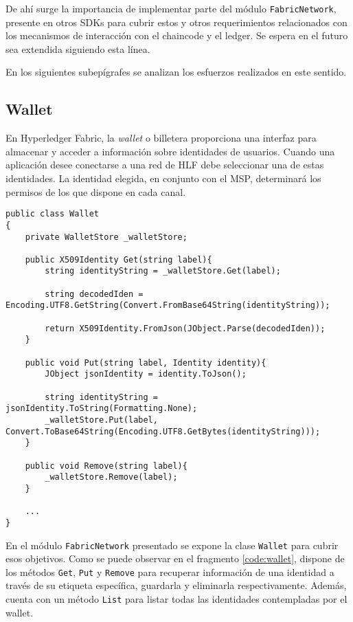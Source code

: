 De ah\'i surge la importancia de implementar parte del m\'odulo \texttt{FabricNetwork}, presente en otros SDKs para cubrir estos y otros requerimientos relacionados con los mecanismos de interacci\'on con el chaincode y el ledger. Se espera en el futuro sea extendida siguiendo esta l\'inea.

En los siguientes subep\'igrafes se analizan los esfuerzos realizados en este sentido.%

\subsection{Wallet}

En Hyperledger Fabric, la \emph{wallet} o billetera proporciona una interfaz para almacenar y acceder a información sobre identidades de usuarios. Cuando una aplicaci\'on desee conectarse a una red de HLF debe seleccionar una de estas identidades. La identidad elegida, en conjunto con el MSP, determinar\'a los permisos de los que dispone en cada canal. %

\begin{lstlisting}[caption={Elementos de la clase \texttt{Wallet}.}, label={code:wallet}]
public class Wallet
{
	private WalletStore _walletStore;

	public X509Identity Get(string label){
		string identityString = _walletStore.Get(label);
		
		string decodedIden = Encoding.UTF8.GetString(Convert.FromBase64String(identityString));
		
		return X509Identity.FromJson(JObject.Parse(decodedIden));
	}

	public void Put(string label, Identity identity){
		JObject jsonIdentity = identity.ToJson();
		
		string identityString = jsonIdentity.ToString(Formatting.None);
		_walletStore.Put(label, Convert.ToBase64String(Encoding.UTF8.GetBytes(identityString)));
	}

	public void Remove(string label){
		_walletStore.Remove(label);
	}
	
	...
}
\end{lstlisting}

En el m\'odulo \texttt{FabricNetwork} presentado se expone la clase \texttt{Wallet} para cubrir esos objetivos. Como se puede observar en el fragmento \ref{code:wallet}, dispone de los m\'etodos \texttt{Get}, \texttt{Put} y \texttt{Remove} para recuperar informaci\'on de una identidad a trav\'es de su etiqueta espec\'ifica, guardarla y eliminarla respectivamente. Adem\'as, cuenta con un m\'etodo \texttt{List} para listar todas las identidades contempladas por el wallet. 

